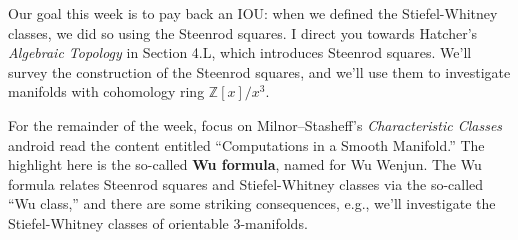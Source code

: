\documentclass{homework}
\author{Jim Fowler}
\date{Week 9: Steenrod squares}
\begin{document}
\maketitle

Our goal this week is to pay back an IOU: when we defined the
Stiefel-Whitney classes, we did so using the Steenrod squares.  I
direct you towards Hatcher's \textit{Algebraic Topology} in Section
\textsection 4.L, which introduces Steenrod squares.  We'll survey the
construction of the Steenrod squares, and we'll use them to
investigate manifolds with cohomology ring $\mathbb{Z}[x]/x^3$.

For the remainder of the week, focus on Milnor--Stasheff's
\textit{Characteristic Classes} android read the content entitled
``Computations in a Smooth Manifold.''  The highlight here is the
so-called \textbf{Wu formula}, named for Wu Wenjun.  The Wu formula
relates Steenrod squares and Stiefel-Whitney classes via the so-called
``Wu class,'' and there are some striking consequences, e.g., we'll
investigate the Stiefel-Whitney classes of orientable 3-manifolds.
\end{document}
